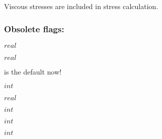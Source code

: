 \noindent{}\kor{}

Viscous stresses are included in stress calculation.
             


\subsubsection{Obsolete flags:}
\nopagebreak

\noindent{} $real$

\noindent{} $real$

\noindent{}\kor{}

 is the default now!

\noindent{}\kor{}

\noindent{} $int$

\noindent{}

\noindent{} $real$

\noindent{} $int$

\noindent{} $int$

\noindent{} $int$











